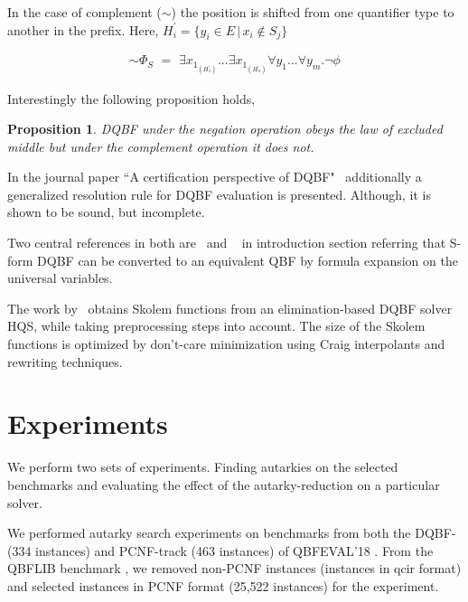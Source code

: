 \documentclass[runningheads]{llncs}
\newtheorem{prop}{Proposition}
\begin{document}
In the case of complement ($\sim$) the position is shifted from one quantifier type to another in the prefix. Here, $H^{\prime}_{i} = \{ y_{i} \in E \, | \, x_{i} \notin S_{j} \}$

\begin{align}
\sim \Phi_{S} \,\, =   \,\, \exists x_{1_{(H^{\prime}_1)}}... \exists x_{1_{(H^{\prime}_n)}} \forall y_{1}...\forall y_{m} . \neg \phi \label{eq4}
\end{align}

Interestingly the following proposition holds, 
\begin{prop}
	DQBF under the negation operation obeys the law of excluded middle but under the complement operation it does not.
\end{prop} 

In the journal paper ``A certification perspective of DQBF"~\cite{balabanov2014henkin} additionally a generalized resolution rule for DQBF evaluation is presented. Although,  it is shown to be sound, but incomplete.

Two central references in both are~\cite{bubeck2006dependency} and ~\cite{bubeck2010model} in introduction section referring that S-form DQBF can be converted to an equivalent QBF by formula expansion on the universal variables.


The work by~\cite{wimmer2016skolem} obtains Skolem functions from an elimination-based DQBF solver HQS, while taking preprocessing steps into account.
%
The size of the Skolem functions is optimized by don’t-care minimization using Craig interpolants and rewriting techniques.


\section{Experiments}\label{sec:experiments}
We perform two sets of experiments. Finding autarkies on the selected benchmarks and evaluating the effect of the autarky-reduction on a particular solver.

We performed autarky search experiments on benchmarks from both the DQBF- (334 instances) and  PCNF-track (463 instances) of QBFEVAL'18 \cite{Qbfeval18}.
%
From the QBFLIB benchmark \cite{Qbflib}, we removed non-PCNF instances (instances in qcir format) and selected instances in PCNF format (25,522 instances) for the experiment.

\end{document}
